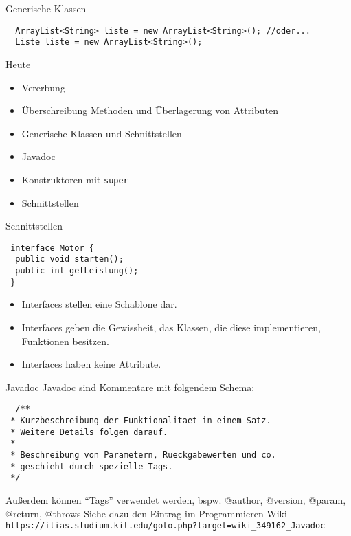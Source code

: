 \documentclass[18pt]{beamer}
\begin{document}
\begin{frame}[fragile]{Generische Klassen}
 \begin{lstlisting}
  ArrayList<String> liste = new ArrayList<String>(); //oder...
  Liste liste = new ArrayList<String>();
 \end{lstlisting}
\end{frame}

\begin{frame}[fragile]{Heute}
\begin{itemize}
 \item Vererbung \checkmark
 \item Überschreibung Methoden und Überlagerung von Attributen \checkmark
 \item Generische Klassen und Schnittstellen \checkmark
 \item Javadoc
 \item Konstruktoren mit \verb|super| \checkmark
 \item Schnittstellen
\end{itemize}
\end{frame}


\begin{frame}[fragile]{Schnittstellen}
\begin{lstlisting}
 interface Motor {
  public void starten();
  public int getLeistung();
 }
 \end{lstlisting}
 \begin{itemize}
  \item Interfaces stellen eine Schablone dar.
  \item Interfaces geben die Gewissheit, das Klassen, die diese implementieren, Funktionen besitzen.
  \item Interfaces haben keine Attribute.
 \end{itemize}

\end{frame}

\begin{frame}[fragile]{Javadoc}
 Javadoc sind Kommentare mit folgendem Schema:
 \begin{lstlisting}
  /**
 * Kurzbeschreibung der Funktionalitaet in einem Satz.
 * Weitere Details folgen darauf.
 * 
 * Beschreibung von Parametern, Rueckgabewerten und co.
 * geschieht durch spezielle Tags.
 */
 \end{lstlisting}
Außerdem können ``Tags'' verwendet werden, bspw. @author, @version, @param, @return, @throws
Siehe dazu den Eintrag im Programmieren Wiki
\scriptsize
\verb|https://ilias.studium.kit.edu/goto.php?target=wiki_349162_Javadoc|
\end{frame}
\end{document}
